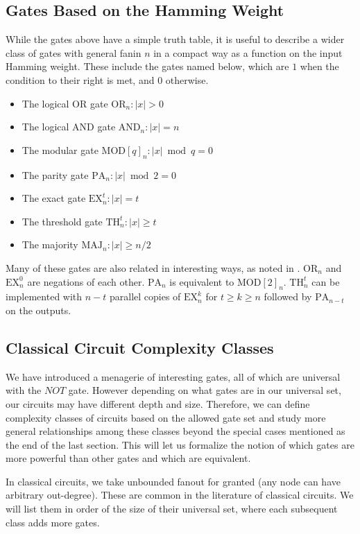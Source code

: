\subsection{Gates Based on the Hamming Weight}

While the gates above have a simple truth table, it is
useful to describe a wider class of gates with general
fanin $n$ in a compact way as a function on the input
Hamming weight. These include the gates named below, which
are $1$ when the condition to their right is met, and $0$
otherwise.

\begin{itemize}
\item The logical OR gate $\text{OR}_n: |x| > 0$
\item The logical AND gate $\text{AND}_n: |x| = n$
\item The modular gate $\text{MOD}[q]_n: |x| \bmod q = 0$
\item The parity gate $\text{PA}_n: |x| \bmod 2 = 0$
\item The exact gate $\text{EX}^t_n: |x| = t$
\item The threshold gate $\text{TH}^t_n: |x| \ge t$
\item The majority $\text{MAJ}_n: |x| \ge n/2$
\end{itemize}

Many of these gates are also related in interesting ways,
as noted in \cite{Takahashi2011}.
$\text{OR}_n$ and $\text{EX}^0_n$ are
negations of each other. $\text{PA}_n$ is equivalent to
$\text{MOD}[2]_n$. $\text{TH}^t_n$ can be implemented with
$n-t$ parallel copies of $\text{EX}^k_n$ for $t \ge k \ge n$
followed by $\text{PA}_{n-t}$ on the outputs.

\subsection{Classical Circuit Complexity Classes}

We have introduced a menagerie of interesting gates,
all of which are universal with the $NOT$ gate. However depending
on what gates are in our universal set, our circuits may have
different depth and size. Therefore, we can define complexity classes
of circuits based on the allowed gate set and study more general
relationships among these classes beyond the special cases mentioned
as the end of the last section. This will let us formalize the notion of
which gates are more powerful than other gates and which are equivalent.
 
In classical circuits, we take unbounded fanout
for granted (any node can have arbitrary out-degree). These are common
in the literature of classical circuits. We will list them in order
of the size of their universal set, where each subsequent class adds
more gates.

